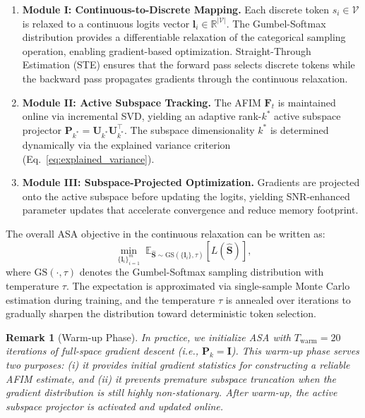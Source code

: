 ﻿\documentclass[lettersize,journal]{IEEEtran}
\newtheorem{remark}{Remark}
\begin{document}
\begin{enumerate}[leftmargin=*]
    \item \textbf{Module I: Continuous-to-Discrete Mapping.} Each discrete token $s_i \in \mathcal{V}$ is relaxed to a continuous logits vector $\mathbf{l}_i \in \mathbb{R}^{|\mathcal{V}|}$. The Gumbel-Softmax distribution provides a differentiable relaxation of the categorical sampling operation, enabling gradient-based optimization. Straight-Through Estimation (STE) ensures that the forward pass selects discrete tokens while the backward pass propagates gradients through the continuous relaxation.
    
    \item \textbf{Module II: Active Subspace Tracking.} The AFIM $\mathbf{F}_t$ is maintained online via incremental SVD, yielding an adaptive rank-$k^*$ active subspace projector $\mathbf{P}_{k^*} = \mathbf{U}_{k^*} \mathbf{U}_{k^*}^\top$. The subspace dimensionality $k^*$ is determined dynamically via the explained variance criterion (Eq.~\eqref{eq:explained_variance}).
    
    \item \textbf{Module III: Subspace-Projected Optimization.} Gradients are projected onto the active subspace before updating the logits, yielding SNR-enhanced parameter updates that accelerate convergence and reduce memory footprint.
\end{enumerate}

The overall ASA objective in the continuous relaxation can be written as:
\begin{equation}
\label{eq:asa_objective}
\min_{\{\mathbf{l}_i\}_{i=1}^m} \; \mathbb{E}_{\hat{\mathbf{S}} \sim \text{GS}(\{\mathbf{l}_i\}, \tau)} \left[ L(\hat{\mathbf{S}}) \right],
\end{equation}
where $\text{GS}(\cdot, \tau)$ denotes the Gumbel-Softmax sampling distribution with temperature $\tau$. The expectation is approximated via single-sample Monte Carlo estimation during training, and the temperature $\tau$ is annealed over iterations to gradually sharpen the distribution toward deterministic token selection.

\begin{remark}[Warm-up Phase]
\label{rem:warmup}
In practice, we initialize ASA with $T_{\text{warm}} = 20$ iterations of full-space gradient descent (i.e., $\mathbf{P}_k = \mathbf{I}$). This warm-up phase serves two purposes: \textit{(i)} it provides initial gradient statistics for constructing a reliable AFIM estimate, and \textit{(ii)} it prevents premature subspace truncation when the gradient distribution is still highly non-stationary. After warm-up, the active subspace projector is activated and updated online.
\end{remark}
\end{document}
